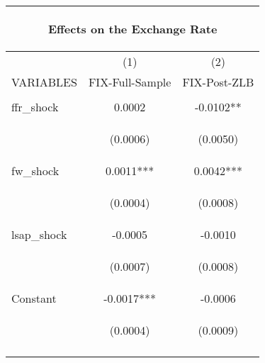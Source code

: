 \begin{center}
\begin{tabular}{lcc}
\multicolumn{3}{c}{\begin{large}Effects on the Exchange Rate\end{large}} \\ \hline
 & (1) & (2) \\
VARIABLES & FIX-Full-Sample & FIX-Post-ZLB \\ \hline
\vspace{4pt} & \begin{footnotesize}\end{footnotesize} & \begin{footnotesize}\end{footnotesize} \\
ffr\_shock & 0.0002 & -0.0102** \\
\vspace{4pt} & \begin{footnotesize}(0.0006)\end{footnotesize} & \begin{footnotesize}(0.0050)\end{footnotesize} \\
fw\_shock & 0.0011*** & 0.0042*** \\
\vspace{4pt} & \begin{footnotesize}(0.0004)\end{footnotesize} & \begin{footnotesize}(0.0008)\end{footnotesize} \\
lsap\_shock & -0.0005 & -0.0010 \\
\vspace{4pt} & \begin{footnotesize}(0.0007)\end{footnotesize} & \begin{footnotesize}(0.0008)\end{footnotesize} \\
Constant & -0.0017*** & -0.0006 \\
 & \begin{footnotesize}(0.0004)\end{footnotesize} & \begin{footnotesize}(0.0009)\end{footnotesize} \\
\vspace{4pt} & \begin{footnotesize}\end{footnotesize} & \begin{footnotesize}\end{footnotesize} \\

\end{tabular}
\end{center}
